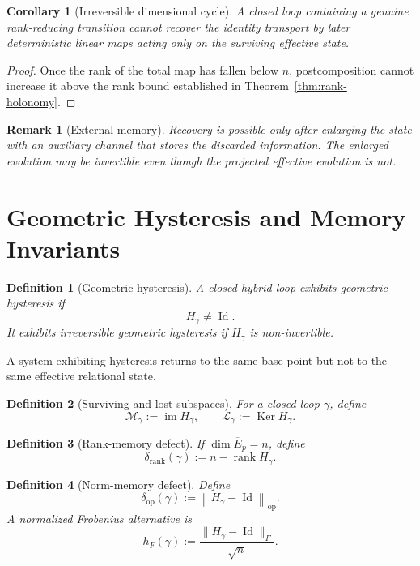 \documentclass[11pt]{article}
\newtheorem{definition}{Definition}[section]
\newtheorem{corollary}{Corollary}[section]
\newtheorem{remark}{Remark}[section]
\newcommand{\Id}{\operatorname{Id}}
\newcommand{\Ker}{\operatorname{Ker}}
\newcommand{\rank}{\operatorname{rank}}
\newcommand{\im}{\operatorname{im}}
\newcommand{\opnorm}[1]{\left\lVert #1\right\rVert_{\mathrm{op}}}
\begin{document}
\begin{corollary}[Irreversible dimensional cycle]
A closed loop containing a genuine rank-reducing transition cannot recover the
identity transport by later deterministic linear maps acting only on the
surviving effective state.
\end{corollary}

\begin{proof}
Once the rank of the total map has fallen below $n$, postcomposition cannot
increase it above the rank bound established in
Theorem~\ref{thm:rank-holonomy}.
\end{proof}

\begin{remark}[External memory]
Recovery is possible only after enlarging the state with an auxiliary channel
that stores the discarded information. The enlarged evolution may be
invertible even though the projected effective evolution is not.
\end{remark}

\section{Geometric Hysteresis and Memory Invariants}
\label{sec:hysteresis}

\begin{definition}[Geometric hysteresis]
A closed hybrid loop exhibits geometric hysteresis if
\[
H_\gamma\ne\Id.
\]
It exhibits irreversible geometric hysteresis if $H_\gamma$ is non-invertible.
\end{definition}

A system exhibiting hysteresis returns to the same base point but not to the
same effective relational state.

\begin{definition}[Surviving and lost subspaces]
For a closed loop $\gamma$, define
\[
\mathcal M_\gamma:=\im H_\gamma,
\qquad
\mathcal L_\gamma:=\Ker H_\gamma.
\]
\end{definition}

\begin{definition}[Rank-memory defect]
If $\dim\overline E_p=n$, define
\[
\delta_{\mathrm{rank}}(\gamma):=n-\rank H_\gamma.
\]
\end{definition}

\begin{definition}[Norm-memory defect]
Define
\[
\delta_{\mathrm{op}}(\gamma):=
\opnorm{H_\gamma-\Id}.
\]
A normalized Frobenius alternative is
\[
h_F(\gamma):=
\frac{\|H_\gamma-\Id\|_F}{\sqrt n}.
\]
\end{definition}
\end{document}
